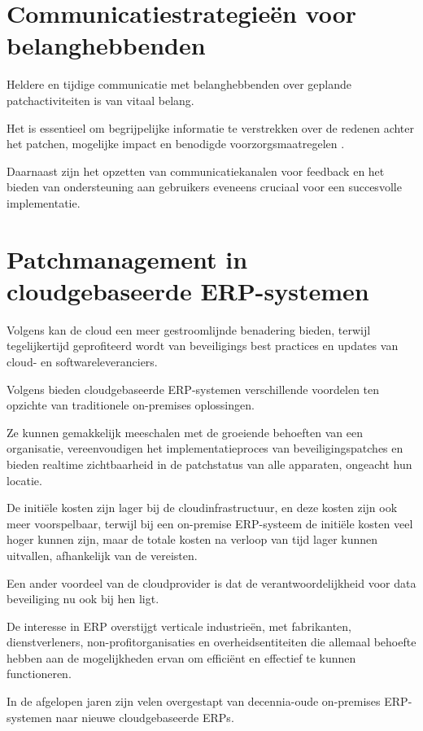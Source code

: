 \section{Communicatiestrategieën voor belanghebbenden}
Heldere en tijdige communicatie met belanghebbenden over geplande patchactiviteiten is van vitaal belang.

 Het is essentieel om begrijpelijke informatie te verstrekken over de redenen achter het patchen, mogelijke impact en benodigde voorzorgsmaatregelen \autocite{Toren2019}.

 
Daarnaast zijn het opzetten van communicatiekanalen voor feedback en het bieden van ondersteuning aan gebruikers eveneens cruciaal voor een succesvolle implementatie.



\section{Patchmanagement in cloudgebaseerde ERP-systemen}
Volgens \textcite{Forbes2021} kan de cloud een meer gestroomlijnde benadering bieden, terwijl tegelijkertijd geprofiteerd wordt van beveiligings best practices en updates van cloud- en softwareleveranciers.

 Volgens \textcite{Cox2020} bieden cloudgebaseerde ERP-systemen verschillende voordelen  ten opzichte van traditionele on-premises oplossingen.

 Ze kunnen gemakkelijk meeschalen met de groeiende behoeften van een organisatie, vereenvoudigen het implementatieproces van beveiligingspatches en bieden realtime zichtbaarheid in de patchstatus van alle apparaten, ongeacht hun locatie.

 De initiële kosten zijn lager bij de cloudinfrastructuur, en deze kosten zijn ook meer voorspelbaar, terwijl bij een on-premise ERP-systeem de initiële kosten veel hoger kunnen zijn, maar de totale kosten na verloop van tijd lager kunnen uitvallen, afhankelijk van de vereisten.

 Een ander voordeel van de cloudprovider is dat de verantwoordelijkheid voor data beveiliging nu ook bij hen ligt.


De interesse in ERP overstijgt verticale industrieën, met fabrikanten, dienstverleners, non-profitorganisaties en overheidsentiteiten die allemaal behoefte hebben aan de mogelijkheden ervan om efficiënt en effectief te kunnen functioneren.

 In de afgelopen jaren zijn velen overgestapt van decennia-oude on-premises ERP-systemen naar nieuwe cloudgebaseerde ERPs.

